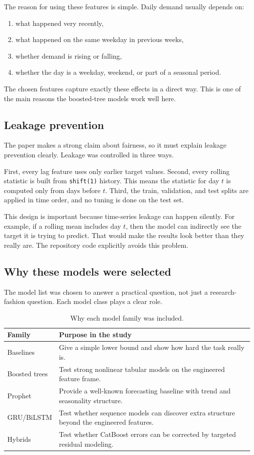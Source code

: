 \documentclass[conference]{IEEEtran}
\begin{document}
The reason for using these features is simple. Daily demand usually depends on:
\begin{enumerate}
\item what happened very recently,
\item what happened on the same weekday in previous weeks,
\item whether demand is rising or falling,
\item whether the day is a weekday, weekend, or part of a seasonal period.
\end{enumerate}

The chosen features capture exactly these effects in a direct way. This is one of the main reasons the boosted-tree models work well here.

\subsection{Leakage prevention}
The paper makes a strong claim about fairness, so it must explain leakage prevention clearly. Leakage was controlled in three ways.

First, every lag feature uses only earlier target values. Second, every rolling statistic is built from \texttt{shift(1)} history. This means the statistic for day $t$ is computed only from days before $t$. Third, the train, validation, and test splits are applied in time order, and no tuning is done on the test set.

This design is important because time-series leakage can happen silently. For example, if a rolling mean includes day $t$, then the model can indirectly see the target it is trying to predict. That would make the results look better than they really are. The repository code explicitly avoids this problem.

\subsection{Why these models were selected}
The model list was chosen to answer a practical question, not just a research-fashion question. Each model class plays a clear role.

\begin{table}[t]
\caption{Why each model family was included.}
\label{tab:model_rationale}
\centering
\begin{tabular}{p{1.6cm}p{5.4cm}}
\toprule
\textbf{Family} & \textbf{Purpose in the study} \\
\midrule
Baselines & Give a simple lower bound and show how hard the task really is. \\
Boosted trees & Test strong nonlinear tabular models on the engineered feature frame. \\
Prophet & Provide a well-known forecasting baseline with trend and seasonality structure. \\
GRU/BiLSTM & Test whether sequence models can discover extra structure beyond the engineered features. \\
Hybrids & Test whether CatBoost errors can be corrected by targeted residual modeling. \\
\bottomrule
\end{tabular}
\end{table}
\end{document}
